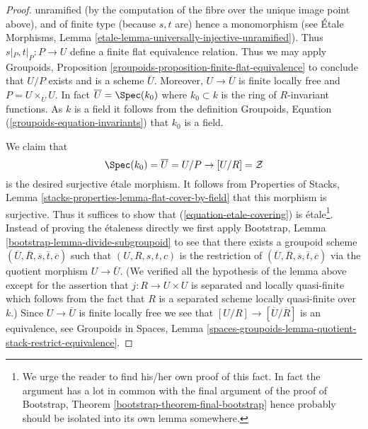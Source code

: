 \begin{proof}
unramified (by the computation of the fibre over the unique image point
above), and of finite type (because $s, t$ are) hence a monomorphism (see
\'Etale Morphisms, Lemma
\ref{etale-lemma-universally-injective-unramified}).
Thus $s|_P, t|_P : P \to U$ define a finite flat equivalence
relation. Thus we may apply
Groupoids, Proposition \ref{groupoids-proposition-finite-flat-equivalence}
to conclude that $U/P$ exists and is a scheme $\overline{U}$.
Moreover, $U \to \overline{U}$ is finite locally free and
$P = U \times_{\overline{U}} U$.
In fact $\overline{U} = \Spec(k_0)$ where $k_0 \subset k$ is the
ring of $R$-invariant functions. As $k$ is a field it follows
from the definition
Groupoids, Equation (\ref{groupoids-equation-invariants})
that $k_0$ is a field.

\medskip\noindent
We claim that
\begin{equation}
\label{equation-etale-covering}
\Spec(k_0) = \overline{U} = U/P \to [U/R] = \mathcal{Z}
\end{equation}
is the desired surjective \'etale morphism. It follows from
Properties of Stacks, Lemma \ref{stacks-properties-lemma-flat-cover-by-field}
that this morphism is surjective. Thus it suffices to show that
(\ref{equation-etale-covering}) is \'etale\footnote{We urge the
reader to find his/her own proof of this fact. In fact the argument
has a lot in common with the final argument of the proof of
Bootstrap, Theorem \ref{bootstrap-theorem-final-bootstrap}
hence probably should be isolated into its own lemma somewhere.}.
Instead of proving the \'etaleness
directly we first apply
Bootstrap, Lemma \ref{bootstrap-lemma-divide-subgroupoid}
to see that there exists a groupoid scheme
$(\overline{U}, \overline{R}, \overline{s}, \overline{t}, \overline{c})$
such that $(U, R, s, t, c)$ is the restriction of
$(\overline{U}, \overline{R}, \overline{s}, \overline{t}, \overline{c})$
via the quotient morphism $U \to \overline{U}$.
(We verified all the hypothesis of the lemma above except for the assertion
that $j : R \to U \times U$ is separated and locally quasi-finite
which follows from the fact that $R$ is a separated scheme locally quasi-finite
over $k$.) Since $U \to \overline{U}$ is finite locally free
we see that $[U/R] \to [\overline{U}/\overline{R}]$ is an equivalence, see
Groupoids in Spaces,
Lemma \ref{spaces-groupoids-lemma-quotient-stack-restrict-equivalence}.


\end{proof}

